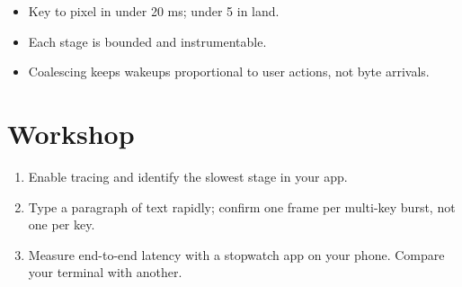 \begin{recap}
\begin{itemize}[leftmargin=*]
  \item Key to pixel in under 20 ms; under 5 in \maya{} land.
  \item Each stage is bounded and instrumentable.
  \item Coalescing keeps wakeups proportional to user
    actions, not byte arrivals.
\end{itemize}
\end{recap}

\section*{Workshop}

\begin{enumerate}[leftmargin=*]
  \item Enable tracing and identify the slowest stage in
    your app.
  \item Type a paragraph of text rapidly; confirm one
    frame per multi-key burst, not one per key.
  \item Measure end-to-end latency with a stopwatch app
    on your phone. Compare your terminal with another.
\end{enumerate}
